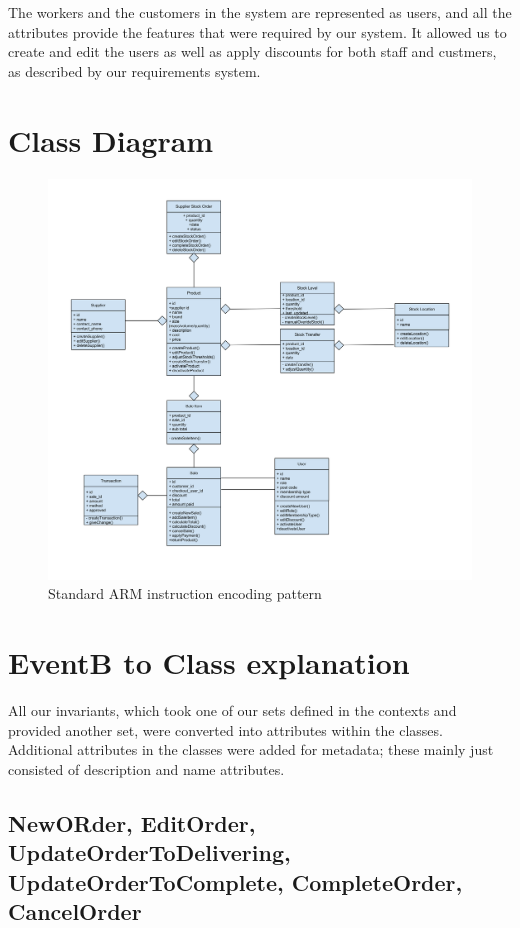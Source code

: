 \documentclass[a4paper]{article}
\begin{document}
The workers and the customers in the system are represented as users, and all the attributes provide the features that were required by our system. It allowed us to create and edit the users as well as apply discounts for both staff and custmers, as described by our requirements system. 

\pagebreak
\section{Class Diagram}

\begin{figure}[h]
\centering
  \includegraphics[scale=0.5]{Class diagram.svg}
	\caption{Standard ARM instruction encoding pattern}
\end{figure}

\pagebreak
\section{EventB to Class explanation}
All our invariants, which took one of our sets defined in the contexts and provided another set, were converted into attributes within the classes. Additional attributes in the classes were added for metadata; these mainly just consisted of description and name attributes. 

\subsection{NewORder, EditOrder, UpdateOrderToDelivering, UpdateOrderToComplete, CompleteOrder, CancelOrder}
\end{document}

